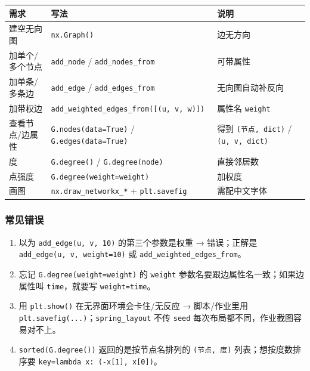 {\def\LTcaptype{none} %
\begin{longtable}[]{@{}
  >{\raggedright\arraybackslash}p{}
  >{\raggedright\arraybackslash}p{}
  >{\raggedright\arraybackslash}p{}@{}}
\toprule\noalign{}
\begin{minipage}[b]{\linewidth}\raggedright
需求
\end{minipage} & \begin{minipage}[b]{\linewidth}\raggedright
写法
\end{minipage} & \begin{minipage}[b]{\linewidth}\raggedright
说明
\end{minipage} \\
\midrule\noalign{}
\endhead
\bottomrule\noalign{}
\endlastfoot
建空无向图 & \texttt{nx.Graph()} & 边无方向 \\
加单个/多个节点 & \texttt{add\_node} / \texttt{add\_nodes\_from} &
可带属性 \\
加单条/多条边 & \texttt{add\_edge} / \texttt{add\_edges\_from} &
无向图自动补反向 \\
加带权边 & \texttt{add\_weighted\_edges\_from({[}(u,\ v,\ w){]})} &
属性名 \texttt{weight} \\
查看节点/边属性 & \texttt{G.nodes(data=True)} /
\texttt{G.edges(data=True)} & 得到 \texttt{(节点,\ dict)} /
\texttt{(u,\ v,\ dict)} \\
度 & \texttt{G.degree()} / \texttt{G.degree(node)} & 直接邻居数 \\
点强度 &
\texttt{G.degree(weight=\textquotesingle{}weight\textquotesingle{})} &
加权度 \\
画图 & \texttt{nx.draw\_networkx\_*} + \texttt{plt.savefig} &
需配中文字体 \\
\end{longtable}
}

\subsubsection{常见错误}\label{ux5e38ux89c1ux9519ux8bef-24}

\begin{enumerate}
\def\labelenumi{\arabic{enumi}.}
\tightlist
\item
  以为 \texttt{add\_edge(u,\ v,\ 10)} 的第三个参数是权重 → 错误；正解是
  \texttt{add\_edge(u,\ v,\ weight=10)} 或
  \texttt{add\_weighted\_edges\_from}。
\item
  忘记
  \texttt{G.degree(weight=\textquotesingle{}weight\textquotesingle{})}
  的 \texttt{weight} 参数名要跟边属性名一致；如果边属性叫
  \texttt{time}，就要写
  \texttt{weight=\textquotesingle{}time\textquotesingle{}}。
\item
  用 \texttt{plt.show()} 在无界面环境会卡住/无反应 → 脚本/作业里用
  \texttt{plt.savefig(...)}；\texttt{spring\_layout} 不传 \texttt{seed}
  每次布局都不同，作业截图容易对不上。
\item
  \texttt{sorted(G.degree())} 返回的是按节点名排列的
  \texttt{(节点,\ 度)} 列表；想按度数排序要
  \texttt{key=lambda\ x:\ (-x{[}1{]},\ x{[}0{]})}。
\end{enumerate}

